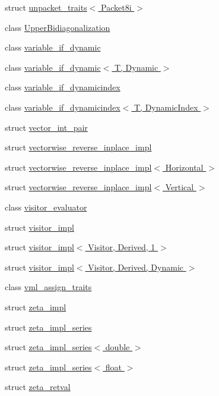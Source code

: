 \begin{DoxyCompactItemize}
struct \hyperlink{struct_eigen_1_1internal_1_1unpacket__traits_3_01_packet8i_01_4}{unpacket\+\_\+traits$<$ Packet8i $>$}
\item 
class \hyperlink{class_eigen_1_1internal_1_1_upper_bidiagonalization}{Upper\+Bidiagonalization}
\item 
class \hyperlink{class_eigen_1_1internal_1_1variable__if__dynamic}{variable\+\_\+if\+\_\+dynamic}
\item 
class \hyperlink{class_eigen_1_1internal_1_1variable__if__dynamic_3_01_t_00_01_dynamic_01_4}{variable\+\_\+if\+\_\+dynamic$<$ T, Dynamic $>$}
\item 
class \hyperlink{class_eigen_1_1internal_1_1variable__if__dynamicindex}{variable\+\_\+if\+\_\+dynamicindex}
\item 
class \hyperlink{class_eigen_1_1internal_1_1variable__if__dynamicindex_3_01_t_00_01_dynamic_index_01_4}{variable\+\_\+if\+\_\+dynamicindex$<$ T, Dynamic\+Index $>$}
\item 
struct \hyperlink{struct_eigen_1_1internal_1_1vector__int__pair}{vector\+\_\+int\+\_\+pair}
\item 
struct \hyperlink{struct_eigen_1_1internal_1_1vectorwise__reverse__inplace__impl}{vectorwise\+\_\+reverse\+\_\+inplace\+\_\+impl}
\item 
struct \hyperlink{struct_eigen_1_1internal_1_1vectorwise__reverse__inplace__impl_3_01_horizontal_01_4}{vectorwise\+\_\+reverse\+\_\+inplace\+\_\+impl$<$ Horizontal $>$}
\item 
struct \hyperlink{struct_eigen_1_1internal_1_1vectorwise__reverse__inplace__impl_3_01_vertical_01_4}{vectorwise\+\_\+reverse\+\_\+inplace\+\_\+impl$<$ Vertical $>$}
\item 
class \hyperlink{class_eigen_1_1internal_1_1visitor__evaluator}{visitor\+\_\+evaluator}
\item 
struct \hyperlink{struct_eigen_1_1internal_1_1visitor__impl}{visitor\+\_\+impl}
\item 
struct \hyperlink{struct_eigen_1_1internal_1_1visitor__impl_3_01_visitor_00_01_derived_00_011_01_4}{visitor\+\_\+impl$<$ Visitor, Derived, 1 $>$}
\item 
struct \hyperlink{struct_eigen_1_1internal_1_1visitor__impl_3_01_visitor_00_01_derived_00_01_dynamic_01_4}{visitor\+\_\+impl$<$ Visitor, Derived, Dynamic $>$}
\item 
class \hyperlink{class_eigen_1_1internal_1_1vml__assign__traits}{vml\+\_\+assign\+\_\+traits}
\item 
struct \hyperlink{struct_eigen_1_1internal_1_1zeta__impl}{zeta\+\_\+impl}
\item 
struct \hyperlink{struct_eigen_1_1internal_1_1zeta__impl__series}{zeta\+\_\+impl\+\_\+series}
\item 
struct \hyperlink{struct_eigen_1_1internal_1_1zeta__impl__series_3_01double_01_4}{zeta\+\_\+impl\+\_\+series$<$ double $>$}
\item 
struct \hyperlink{struct_eigen_1_1internal_1_1zeta__impl__series_3_01float_01_4}{zeta\+\_\+impl\+\_\+series$<$ float $>$}
\item 
struct \hyperlink{struct_eigen_1_1internal_1_1zeta__retval}{zeta\+\_\+retval}
\end{DoxyCompactItemize}
